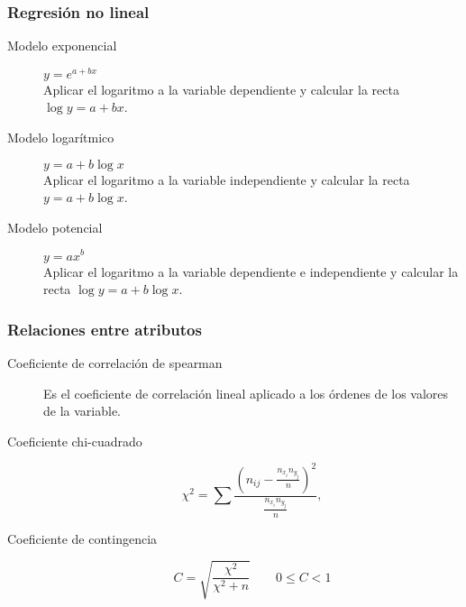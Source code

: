 \documentclass[a4paper]{article}
\newlength{\mylength}
\newenvironment{marco}{
	\setlength{\fboxsep}{5pt}
	\setlength{\mylength}{\textwidth}
	\addtolength{\mylength}{-2\fboxsep}
	\addtolength{\mylength}{-2\fboxrule}
	\noindent
	\begin{Sbox}
	\begin{minipage}{\mylength}
	\setlength{\abovedisplayskip}{3pt}
	\setlength{\belowdisplayskip}{3pt}
}
{
	\end{minipage}
	\end{Sbox}
	\fbox{\TheSbox}
}
\begin{document}
\begin{marco}
\begin{multicols}{2}
\subsubsection*{Regresión no lineal}
\begin{description}
  \item[Modelo exponencial] $y=e^{a+bx}$\\
  Aplicar el logaritmo a la variable dependiente y calcular la recta $\log y = a+bx$.
  \item[Modelo logarítmico] $y=a+b\log x$\\
  Aplicar el logaritmo a la variable independiente y calcular la recta $y=a+b\log x$.
  \item[Modelo potencial] $y=ax^b$\\
  Aplicar el logaritmo a la variable dependiente e independiente y calcular la recta $\log y = a+b\log x$.
\end{description}

\subsubsection*{Relaciones entre atributos}
\begin{description}
\item[Coeficiente de correlación de spearman] Es el coeficiente de correlación lineal aplicado a los órdenes de los valores de la
variable.
\item[Coeficiente chi-cuadrado]
\[
\chi^2 = \sum \frac{\left(n_{ij}-\frac{n_{x_i}n_{y_j}}{n}\right)^2}{\frac{n_{x_i}n_{y_j}}{n}},
\]
\item[Coeficiente de contingencia]
\[
C = \sqrt{\frac{\chi^2}{\chi^2+n}} \qquad 0\leq C <1
\]
\end{description}
\end{multicols}
\end{marco}
\end{document}
